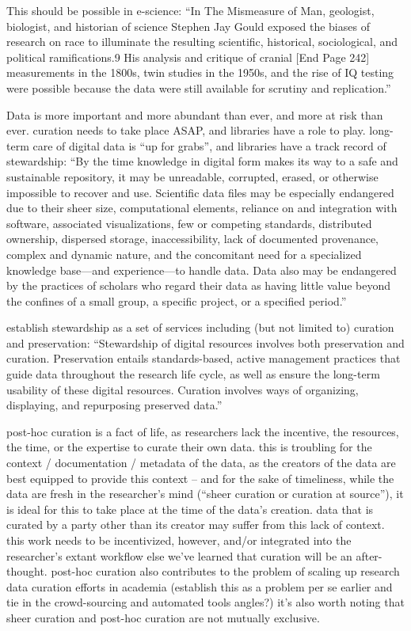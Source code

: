 \documentclass{acm_proc_article-sp}
\begin{document}
This should be possible in e-science: ``In The Mismeasure of Man,
geologist, biologist, and historian of science Stephen Jay Gould
exposed the biases of research on race to illuminate the resulting
scientific, historical, sociological, and political ramifications.9
His analysis and critique of cranial [End Page 242] measurements in
the 1800s, twin studies in the 1950s, and the rise of IQ testing were
possible because the data were still available for scrutiny and
replication.'' \cite{ogburn:imperative}

Data is more important and more abundant than ever, and more at risk
\cite{ogburn:imperative} than ever. curation needs to take place ASAP,
and libraries have a role to play.  long-term care of digital data is
``up for grabs'', and libraries have a track record of stewardship:
``By the time knowledge in digital form makes its way to a safe and
sustainable repository, it may be unreadable, corrupted, erased, or
otherwise impossible to recover and use. Scientific data files may be
especially endangered due to their sheer size, computational elements,
reliance on and integration with software, associated visualizations,
few or competing standards, distributed ownership, dispersed storage,
inaccessibility, lack of documented provenance, complex and dynamic
nature, and the concomitant need for a specialized knowledge base—and
experience—to handle data.  Data also may be endangered by the
practices of scholars who regard their data as having little value
beyond the confines of a small group, a specific project, or a
specified period.'' \cite{ogburn:imperative}

establish stewardship as a set of services including (but not limited
to) curation and preservation: ``Stewardship of digital resources
involves both preservation and curation. Preservation entails
standards-based, active management practices that guide data
throughout the research life cycle, as well as ensure the long-term
usability of these digital resources. Curation involves ways of
organizing, displaying, and repurposing preserved data.''
\cite{arl:stewardship}

post-hoc curation is a fact of life, as researchers lack the
incentive, the resources, the time, or the expertise to curate their
own data. this is troubling for the context / documentation / metadata
of the data, as the creators of the data are best equipped to provide
this context -- and for the sake of timeliness, while the data are
fresh in the researcher's mind (``sheer curation or curation at
source''\cite{curry:community}), it is ideal for this to take place at
the time of the data's creation.  data that is curated by a party
other than its creator may suffer from this lack of context.  this
work needs to be incentivized, however, and/or integrated into the
researcher's extant workflow else we've learned that curation will be
an after-thought. post-hoc curation also contributes to the problem of
scaling up\cite{curry:community} research data curation efforts in
academia (establish this as a problem per se earlier and tie in the
crowd-sourcing and automated tools angles?) it's also worth noting
that sheer curation and post-hoc curation are not mutually exclusive.
\end{document}

